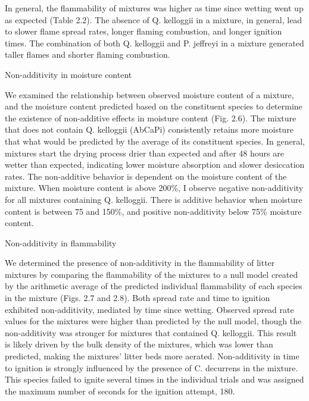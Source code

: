 \documentclass[fire,article,submit,moreauthors,pdftex]{Definitions/mdpi}
\begin{document}
In general, the flammability of mixtures was higher as time since wetting went up as expected (Table 2.2). The absence of Q. kelloggii in a mixture, in general, lead to slower flame spread rates, longer flaming combustion, and longer ignition times. The combination of both Q. kelloggii and P. jeffreyi in a mixture generated taller flames and shorter flaming combustion.

Non-additivity in moisture content

We examined the relationship between observed moisture content of a mixture, and the moisture content predicted based on the constituent species to determine the existence of non-additive effects in moisture content (Fig. 2.6). The mixture that does not contain Q. kelloggii (AbCaPi) consistently retains more moisture that what would be predicted by the average of its constituent species. In general, mixtures start the drying process drier than expected and after 48 hours are wetter than expected, indicating lower moisture absorption and slower desiccation rates. The non-additive behavior is dependent on the moisture content of the mixture. When moisture content is above 200\%, I observe negative non-additivity for all mixtures containing Q. kelloggii. There is additive behavior when moisture content is between 75 and 150\%, and positive non-additivity below 75\% moisture content.

Non-additivity in flammability

We determined the presence of non-additivity in the flammability of litter mixtures by comparing the flammability of the mixtures to a null model created by the arithmetic average of the predicted individual flammability of each species in the mixture (Figs. 2.7 and 2.8). Both spread rate and time to ignition exhibited non-additivity, mediated by time since wetting. Observed spread rate values for the mixtures were higher than predicted by the null model, though the non-additivity was stronger for mixtures that contained Q. kelloggii. This result is likely driven by the bulk density of the mixtures, which was lower than predicted, making the mixtures’ litter beds more aerated. Non-additivity in time to ignition is strongly influenced by the presence of C. decurrens in the mixture. This species failed to ignite several times in the individual trials and was assigned the maximum number of seconds for the ignition attempt, 180.


\end{document}
